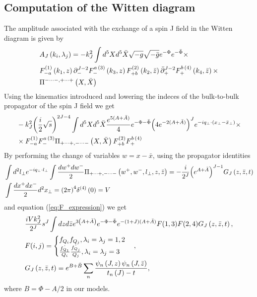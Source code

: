 \documentclass[preprint, 12pt]{elsarticle}
\begin{document}
\subsection{Computation of the Witten diagram}
The amplitude associated with the exchange of a spin J field in the Witten diagram is given by
\begin{align}
&A_J \left(k_i, \lambda_j\right) = - k_J^2 \int d^5X d^5 \bar{X} \sqrt{-g} \sqrt{-\bar{g}} e^{-\Phi} e^{-\bar{\Phi}} \times  \notag \\ 
&F_{- a}^{(1)} \left(k_1, z\right) \partial_{-}^{J-2}F^{a \, (3)}_{-} \left(k_3, z \right)  F_{+ b}^{(2)} \left(k_2, \bar{z}\right) \bar{\partial}_{+}^{J-2}F^{b \, (4)}_{+} \left(k_4, \bar{z} \right) \times \notag \\
& \Pi^{- \dots - , + \dots +}\left(X, \bar{X}\right)
\end{align}
Using the kinematics introduced and lowering the indeces of the bulk-to-bulk propagator of the spin J field we get
\begin{align}
&- k_J^2 {\left( \frac{i}{2} \sqrt{s}\right)}^{2J-4} \int d^5X d^5\bar{X} \frac{e^{5 (A+\bar{A}) }}{4} e^{-\Phi - \bar{\Phi}} {\left(4 e^{-2(A+\bar{A})}\right)}^J e^{-i q_\perp \cdot \left(x_\perp - \bar{x}_\perp\right)} \times \notag \\
& \times F_{-a}^{(1)}F^{a \, (3)}_{-} \Pi_{+\dots+, - \dots -}\left(X, \bar{X}\right)  F_{+ b}^{(2)}F^{b \, (4)}_{+}
\end{align}
By performing the change of variables $w = x - \bar{x}$, using the propagator identities
\begin{align}
&\int d^2l_\perp e^{-i q_\perp \cdot l_\perp} \int \frac{dw^+ dw^-}{2} \Pi_{+\dots+, - \dots -}\left(w^+, w^-, l_\perp, z, \bar{z}\right) = - \frac{i}{2^J} {\left( e ^{A+\bar{A}}\right)}^{J-1} G_J \left(z, \bar{z}, t\right)  \notag \\
& \int \frac{dx^+ dx^-}{2} d^2 x_\perp = {\left(2\pi\right)}^4 \delta^{(4)}\left(0\right) = V
\end{align}
and equation (\ref{eq:F_expression}) we get
\begin{align}
&\frac{i V k_J^2}{2^J} s^J \int dz d\bar{z} e^{3\left(A+\bar{A}\right)} e^{- \Phi - \bar{\Phi}} e^{-(1+J)(A+\bar{A})} F(1,3)F(2,4) G_J \left(z, \bar{z}, t\right), \notag \\
& F(i,j) = 
\begin{cases}
f_{Q_i} f_{Q_j} , \lambda_i = \lambda_j = 1,2 \\
\frac{\dot{f_{Q_1}}}{Q_i} \frac{\dot{f_{Q_j}}}{Q_j}, \lambda_i = \lambda_j = 3
\end{cases}, \notag \\
&G_J \left(z, \bar{z}, t\right) = e^{B+\bar{B}} \sum_n \frac{\psi_n\left(J, z\right) \psi_n \left(J, \bar{z}\right)}{t_n\left(J\right) - t},
\end{align}
where $B = \Phi - A/2$ in our models.
\end{document}
